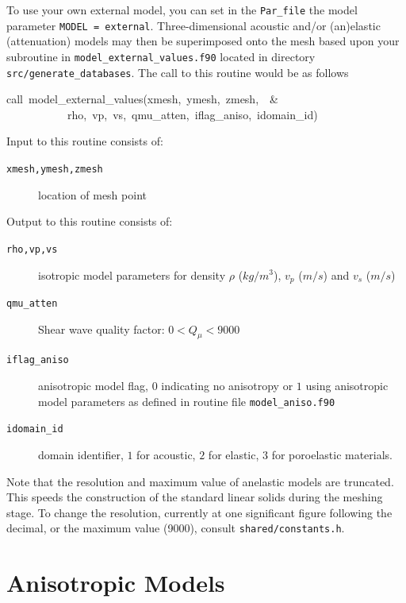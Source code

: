 To use your own external model, you can set in the \texttt{Par\_file}
the model parameter \texttt{MODEL = external}. Three-dimensional acoustic
and/or (an)elastic (attenuation) models may then be superimposed onto
the mesh based upon your subroutine in \texttt{model\_external\_values.f90}
located in directory \texttt{src/generate\_databases}. The call to
this routine would be as follows
\begin{lyxcode}
call~model\_external\_values(xmesh,~ymesh,~zmesh,~~\&~~\\
~~~~~~~~~~~rho,~vp,~vs,~qmu\_atten,~iflag\_aniso,~idomain\_id)
\end{lyxcode}
Input to this routine consists of:
\begin{description}
\item [{\texttt{xmesh,ymesh,zmesh}}] location of mesh point
\end{description}
Output to this routine consists of:
\begin{description}
\item [{\texttt{rho,vp,vs}}] isotropic model parameters for density $\rho$
($kg/m^{3}$), $v_{p}$ ($m/s$) and $v_{s}$ ($m/s$)
\item [{\texttt{qmu\_atten}}] Shear wave quality factor: $0<Q_{\mu}<9000$
\item [{\texttt{iflag\_aniso}}] anisotropic model flag, $0$ indicating
no anisotropy or $1$ using anisotropic model parameters as defined
in routine file \texttt{model\_aniso.f90}
\item [{\texttt{idomain\_id}}] domain identifier, $1$ for acoustic, $2$
for elastic, $3$ for poroelastic materials.
\end{description}
Note that the resolution and maximum value of anelastic models are
truncated. This speeds the construction of the standard linear solids
during the meshing stage. To change the resolution, currently at one
significant figure following the decimal, or the maximum value (9000),
consult \texttt{shared/constants.h}.



\section{Anisotropic Models}\label{sec:Anisotropic-Models}

